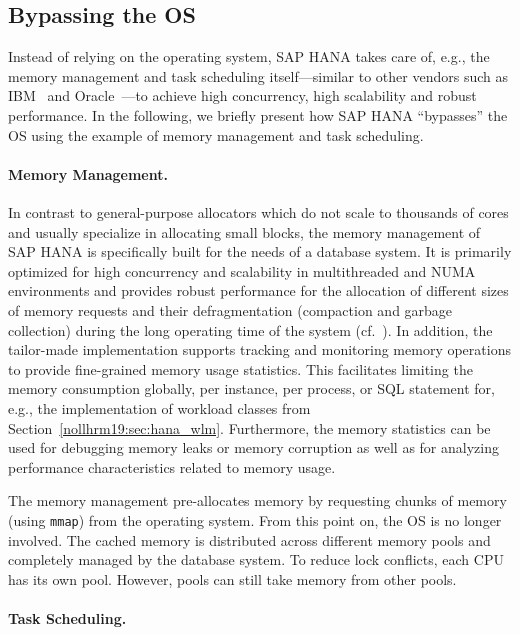 \documentclass[11pt,dvipdfm]{article}
\begin{document}
\subsection{Bypassing the OS}
\label{snollhrm19:sec:bypassing_os}

Instead of relying on the operating system, SAP HANA takes care of, e.g., the memory management and task scheduling itself---similar to other vendors such as IBM~\cite{nollhrm19:IBM:2004:DB2Memory} and Oracle~\cite{nollhrm19:Oracle:2018:Memory}---to achieve high concurrency, high scalability and robust performance.
In the following, we briefly present how SAP HANA ``bypasses'' the OS using the example of memory management and task scheduling.

\paragraph*{Memory Management.}
In contrast to general-purpose allocators which do not scale to thousands of cores and usually specialize in allocating small blocks, the memory management of SAP HANA is specifically built for the needs of a database system.
It is primarily optimized for high concurrency and scalability in multithreaded and NUMA environments and provides robust performance for the  allocation of different sizes of memory requests and their defragmentation (compaction and garbage collection) during the long operating time of the system (cf.~\cite{nollhrm19:Oukid:2017:MMT:3137628.3137629}).
In addition, the tailor-made implementation supports tracking and monitoring memory operations to provide fine-grained memory usage statistics.
This facilitates limiting the memory consumption globally, per instance, per process, or SQL statement for, e.g., the implementation of workload classes from Section~\ref{nollhrm19:sec:hana_wlm}.
Furthermore, the memory statistics can be used for debugging memory leaks or memory corruption as well as for analyzing performance characteristics related to memory usage.

The memory management pre-allocates memory by requesting chunks of memory (using \texttt{mmap}) from the operating system.
From this point on, the OS is no longer involved.
The cached memory is distributed across different memory pools and completely managed by the database system.
To reduce lock conflicts, each CPU has its own pool.
However, pools can still take memory from other pools.


\paragraph*{Task Scheduling.}
\end{document}
